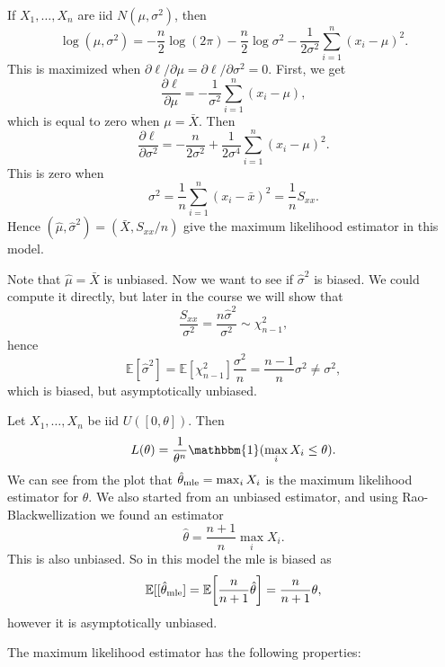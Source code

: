 \documentclass[12pt]{article}
\begin{document}
\begin{exbox}
	If $X_1, \ldots, X_n$ are iid $N(\mu, \sigma^2)$, then
	\[
	\log (\mu, \sigma^2) = - \frac{n}{2} \log(2 \pi) - \frac{n}{2} \log \sigma^2 - \frac{1}{2 \sigma^2} \sum_{i = 1}^{n} (x_i - \mu)^2
	.\]
	This is maximized when $\partial \ell/\partial \mu = \partial \ell/\partial \sigma^2 = 0$. First, we get
	\[
	\frac{\partial \ell}{\partial \mu} = - \frac{1}{\sigma^2} \sum_{i = 1}^{n}(x_i - \mu)
	,\]
	which is equal to zero when $\mu = \bar X$. Then
	\[
	\frac{\partial \ell}{\partial \sigma^2} = - \frac{n}{2 \sigma^2} + \frac{1}{2 \sigma^{4}} \sum_{i = 1}^{n} (x_i - \mu)^{2}
	.\]
	This is zero when
	\[
	\sigma^2 = \frac{1}{n} \sum_{i = 1}^{n} (x_i - \bar x)^2 = \frac{1}{n} S_{x x}
	.\]
	Hence $(\hat \mu, \hat \sigma^2) = (\bar X, S_{x x}/n)$ give the maximum likelihood estimator in this model.

	Note that $\hat \mu = \bar X$ is unbiased. Now we want to see if $\hat \sigma^2$ is biased. We could compute it directly, but later in the course we will show that
	\[
	\frac{S_{x x}}{\sigma^2} = \frac{n \hat \sigma^2}{\sigma^2} \sim \chi^2_{n-1}
	,\]
	hence
	\[
	\mathbb{E}[\hat \sigma^2] = \mathbb{E}[\chi^2_{n-1}] \frac{\sigma^2}{n} = \frac{n-1}{n} \sigma^2 \neq \sigma^2
	,\]
	which is biased, but asymptotically unbiased.
\end{exbox}

\begin{exbox}
	Let $X_1, \ldots, X_n$ be iid $U([0,\theta])$. Then
	\[
		L(\theta) = \frac{1}{\theta^{n}} \mathbbm{1}(\max_{i} X_i \leq \theta)
	.\]
	We can see from the plot that $\hat \theta_{\rm{mle}} = \max_{i} X_i$ is the maximum likelihood estimator for $\theta$. We also started from an unbiased estimator, and using Rao-Blackwellization we found an estimator
	\[
	\hat \theta = \frac{n+1}{n} \max_i X_i
	.\]
	This is also unbiased. So in this model the mle is biased as
	\[
		\mathbb{E}[[\hat \theta_{\rm{mle}}] = \mathbb{E}\biggl[ \frac{n}{n+1} \hat \theta \biggr] = \frac{n}{n+1} \theta
	,\]
	however it is asymptotically unbiased.
\end{exbox}

The maximum likelihood estimator has the following properties:
\end{document}
